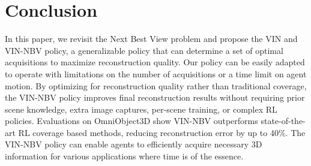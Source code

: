 \section{Conclusion}
\label{sec:conclusion}
\vspace{-0.25em}

In this paper, we revisit the Next Best View problem and propose the VIN and VIN-NBV policy, a generalizable policy that can determine a set of optimal acquisitions to maximize reconstruction quality. Our policy can be easily adapted to operate with limitations on the number of acquisitions or a time limit on agent motion. By optimizing for reconstruction quality rather than traditional coverage, the VIN-NBV policy improves final reconstruction results without requiring prior scene knowledge, extra image captures, per-scene training, or complex RL policies. Evaluations on OmniObject3D \cite{wu2023omniobject3d} show VIN-NBV outperforms state-of-the-art RL coverage based methods, reducing reconstruction error by up to 40\%. The VIN-NBV policy can enable agents to efficiently acquire necessary 3D information for various applications where time is of the essence.